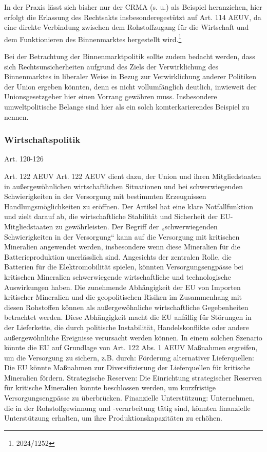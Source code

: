 \documentclass[12pt,a4paper,oneside]{book} %
\begin{document}
{	In der Praxis lässt sich bisher nur der CRMA (s. u.) als Beispiel heranziehen, hier erfolgt die Erlassung des Rechtsakts \grqq insbesondere\glqq gestützt auf Art. 114 AEUV, da eine direkte Verbindung zwischen dem Rohstoffzugang für die Wirtschaft und dem Funktionieren des Binnenmarktes hergestellt wird.\footnote{2024/1252}
	
	Bei der Betrachtung der Binnenmarktpolitik sollte zudem bedacht werden, dass sich Rechtsunsicherheiten aufgrund des Ziels der Verwirklichung des Binnenmarktes in liberaler Weise in Bezug zur Verwirklichung anderer Politiken der Union ergeben könnten, denn es nicht vollumfänglich deutlich, inwieweit der Unionsgesetzgeber hier einen Vorrang gewähren muss.\autocite[§23 Rn 10]{classen_europarecht_2021} Insbesondere umweltpolitische Belange sind hier als ein solch komterkarierendes Beispiel zu nennen.
	
	\subsubsection{Wirtschaftspolitik}
	Art. 120-126
	
	
	Art. 122 AEUV
	Art. 122 AEUV dient dazu, der Union und ihren Mitgliedstaaten in außergewöhnlichen wirtschaftlichen Situationen und bei schwerwiegenden Schwierigkeiten in der Versorgung mit bestimmten Erzeugnissen Handlungsmöglichkeiten zu eröffnen. Der Artikel hat eine klare Notfallfunktion und zielt darauf ab, die wirtschaftliche Stabilität und Sicherheit der EU-Mitgliedstaaten zu gewährleisten. Der Begriff der „schwerwiegenden Schwierigkeiten in der Versorgung“ kann auf die Versorgung mit kritischen Mineralien angewendet werden, insbesondere wenn diese Mineralien für die Batterieproduktion unerlässlich sind. Angesichts der zentralen Rolle, die Batterien für die Elektromobilität spielen, könnten Versorgungsengpässe bei kritischen Mineralien schwerwiegende wirtschaftliche und technologische Auswirkungen haben. Die zunehmende Abhängigkeit der EU von Importen kritischer Mineralien und die geopolitischen Risiken im Zusammenhang mit diesen Rohstoffen können als außergewöhnliche wirtschaftliche Gegebenheiten betrachtet werden. Diese Abhängigkeit macht die EU anfällig für Störungen in der Lieferkette, die durch politische Instabilität, Handelskonflikte oder andere außergewöhnliche Ereignisse verursacht werden können.  In einem solchen Szenario könnte die EU auf Grundlage von Art. 122 Abs. 1 AEUV Maßnahmen ergreifen, um die Versorgung zu sichern, z.B. durch: Förderung alternativer Lieferquellen: Die EU könnte Maßnahmen zur Diversifizierung der Lieferquellen für kritische Mineralien fördern.
	Strategische Reserven: Die Einrichtung strategischer Reserven für kritische Mineralien könnte beschlossen werden, um kurzfristige Versorgungsengpässe zu überbrücken. Finanzielle Unterstützung: Unternehmen, die in der Rohstoffgewinnung und -verarbeitung tätig sind, könnten finanzielle Unterstützung erhalten, um ihre Produktionskapazitäten zu erhöhen.
	
}
\end{document}
